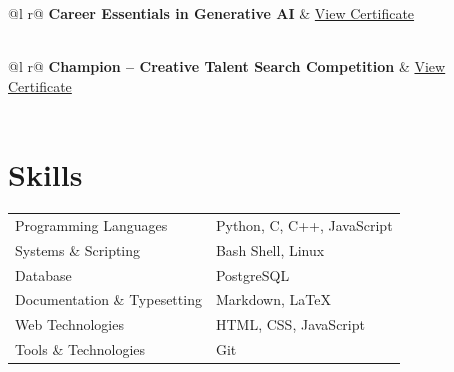 \documentclass[a4paper,12pt]{article}
\begin{document}
\begin{tabularx}{\linewidth}{ @{}l r@{} }
    \textbf{Career Essentials in Generative AI} & \hfill \href{https://www.linkedin.com/learning/certificates/6f72b0e48a5817dc558db49ca0673a70bb89d664f12973b92fb28f3bbaa996db}{View Certificate} \\[3.75pt]
                                                                                                                                         \\
\end{tabularx}

\begin{tabularx}{\linewidth}{ @{}l r@{} }
    \textbf{Champion – Creative Talent Search Competition} & \hfill \href{https://drive.google.com/file/d/1m3npleUNXnW2Rd6uJq2z2-FtGwx6_NgP/view?usp=sharing}{View Certificate} \\[3.75pt]
                                                                            \\
\end{tabularx}

\section{Skills}
\begin{tabularx}{\linewidth}{@{}l X@{}}
	Programming Languages    & \normalsize{Python, C, C++, JavaScript} \\
	Systems \& Scripting     & \normalsize{Bash Shell, Linux} \\
	Database                 & \normalsize{PostgreSQL} \\
	Documentation \& Typesetting & \normalsize{Markdown, \LaTeX} \\
	Web Technologies          & \normalsize{HTML, CSS, JavaScript} \\
	Tools \& Technologies     & \normalsize{Git} \\
\end{tabularx}

\vfill
{}
\end{document}
